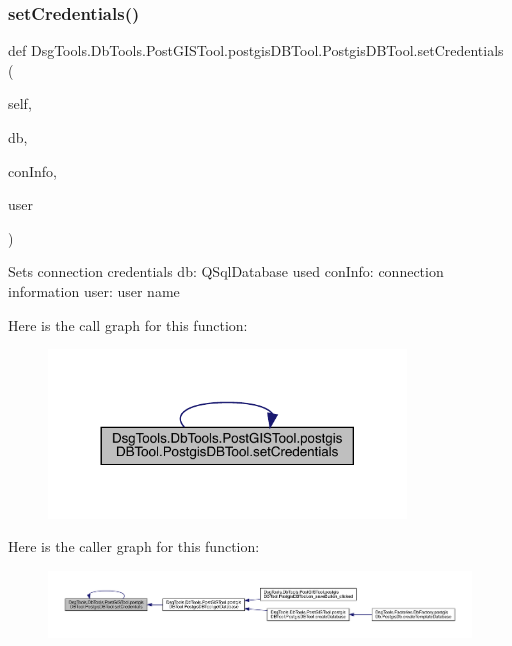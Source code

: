 \subsubsection{\texorpdfstring{set\+Credentials()}{setCredentials()}}
{\footnotesize\ttfamily def Dsg\+Tools.\+Db\+Tools.\+Post\+G\+I\+S\+Tool.\+postgis\+D\+B\+Tool.\+Postgis\+D\+B\+Tool.\+set\+Credentials (\begin{DoxyParamCaption}\item[{}]{self,  }\item[{}]{db,  }\item[{}]{con\+Info,  }\item[{}]{user }\end{DoxyParamCaption})}

\begin{DoxyVerb}Sets connection credentials
db: QSqlDatabase used
conInfo: connection information
user: user name
\end{DoxyVerb}
 Here is the call graph for this function\+:
\nopagebreak
\begin{figure}[H]
\begin{center}
\leavevmode
\includegraphics[width=269pt]{class_dsg_tools_1_1_db_tools_1_1_post_g_i_s_tool_1_1postgis_d_b_tool_1_1_postgis_d_b_tool_a20384954a18f0c1c987c01c7a1ba4db1_cgraph}
\end{center}
\end{figure}
Here is the caller graph for this function\+:
\nopagebreak
\begin{figure}[H]
\begin{center}
\leavevmode
\includegraphics[width=350pt]{class_dsg_tools_1_1_db_tools_1_1_post_g_i_s_tool_1_1postgis_d_b_tool_1_1_postgis_d_b_tool_a20384954a18f0c1c987c01c7a1ba4db1_icgraph}
\end{center}
\end{figure}
\mbox{\label{class_dsg_tools_1_1_db_tools_1_1_post_g_i_s_tool_1_1postgis_d_b_tool_1_1_postgis_d_b_tool_aefe5dcf655069dd0aa32d5d9ea668239}} 
